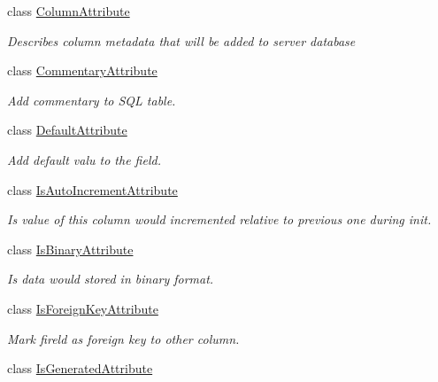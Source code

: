 \begin{DoxyCompactItemize}
\item 
class \mbox{\hyperlink{class_uniform_data_operator_1_1_sql_1_1_markup_1_1_column_attribute}{Column\+Attribute}}
\begin{DoxyCompactList}\small\item\em Describes column metadata that will be added to server database \end{DoxyCompactList}\item 
class \mbox{\hyperlink{class_uniform_data_operator_1_1_sql_1_1_markup_1_1_commentary_attribute}{Commentary\+Attribute}}
\begin{DoxyCompactList}\small\item\em Add commentary to S\+QL table. \end{DoxyCompactList}\item 
class \mbox{\hyperlink{class_uniform_data_operator_1_1_sql_1_1_markup_1_1_default_attribute}{Default\+Attribute}}
\begin{DoxyCompactList}\small\item\em Add default valu to the field. \end{DoxyCompactList}\item 
class \mbox{\hyperlink{class_uniform_data_operator_1_1_sql_1_1_markup_1_1_is_auto_increment_attribute}{Is\+Auto\+Increment\+Attribute}}
\begin{DoxyCompactList}\small\item\em Is value of this column would incremented relative to previous one during init. \end{DoxyCompactList}\item 
class \mbox{\hyperlink{class_uniform_data_operator_1_1_sql_1_1_markup_1_1_is_binary_attribute}{Is\+Binary\+Attribute}}
\begin{DoxyCompactList}\small\item\em Is data would stored in binary format. \end{DoxyCompactList}\item 
class \mbox{\hyperlink{class_uniform_data_operator_1_1_sql_1_1_markup_1_1_is_foreign_key_attribute}{Is\+Foreign\+Key\+Attribute}}
\begin{DoxyCompactList}\small\item\em Mark fireld as foreign key to other column. \end{DoxyCompactList}\item 
class \mbox{\hyperlink{class_uniform_data_operator_1_1_sql_1_1_markup_1_1_is_generated_attribute}{Is\+Generated\+Attribute}}

\end{DoxyCompactItemize}
